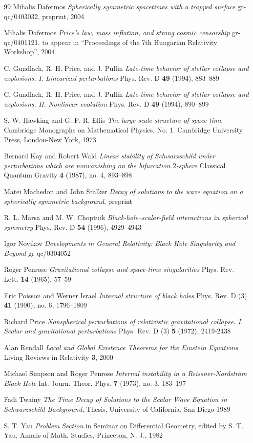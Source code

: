 \begin{thebibliography}{99}
 Mihalis Dafermos \emph{Spherically
symmetric spacetimes with a trapped surface} gr-qc/0403032, preprint,
2004

 Mihalis Dafermos \emph{Price's law,
mass inflation, and strong cosmic censorship} gr-qc/0401121,
to appear in ``Proceedings of the 7th Hungarian Relativity Workshop'',
2004


 C. Gundlach, R. H. Price, and J. Pullin
\emph{Late-time behavior of stellar collapse and explosions. I.
Linearized perturbations} Phys. Rev. D {\bf 49} (1994), 883--889

 C. Gundlach, R. H. Price, and J. Pullin
\emph{Late-time behavior of stellar collapse and explosions. II.
Nonlinear evolution} Phys. Rev. D {\bf 49} (1994), 890--899
 
 S. W. Hawking and G. F. R. Ellis
\emph{The large scale structure of space-time} Cambridge
Monographs on Mathematical Physics, No. 1. Cambridge
University Press, London-New York, 1973

 Bernard Kay and Robert Wald
\emph{Linear stability of Schwarzschild under perturbations
which are nonvanishing on the bifurcation $2$-sphere}
Classical Quantum Gravity {\bf 4} (1987), no. 4, 893--898

 Matei Machedon and
John Stalker \emph{Decay of solutions to the wave
equation on a spherically symmetric background}, preprint

 R. L. Marsa and M. W. Choptuik
\emph{Black-hole--scalar-field interactions in spherical symmetry}
Phys. Rev. D {\bf 54} (1996), 4929--4943

 Igor Novikov \emph{Developments in General Relativity:
Black Hole Singularity and Beyond} gr-qc/0304052

 Roger Penrose \emph{Gravitational collapse
and space-time singularities} Phys. Rev. Lett. {\bf 14} (1965), 57--59

 Eric Poisson and Werner Israel
\emph{Internal structure of black holes}
Phys. Rev. D (3) {\bf 41} (1990), no. 6, 1796--1809

 Richard Price \emph{Nonspherical perturbations
of relativistic gravitational collapse. I. Scalar and gravitational
perturbations} Phys. Rev. D (3) {\bf 5} (1972), 2419-2438

 Alan Rendall
\emph{Local and Global Existence Theorems for the Einstein Equations}
Living Reviews in Relativity {\bf 3}, 2000

 Michael Simpson and Roger Penrose \emph{Internal
instability in a Reissner-Nordstr\"om Black Hole} Int. Journ.
Theor. Phys. {\bf 7} (1973), no. 3, 183--197

 Fadi Twainy \emph{The Time Decay of Solutions
to the Scalar Wave Equation in Schwarzschild Background},
Thesis, University of California, San Diego 1989

 S. T. Yau \emph{Problem Section} in Seminar on
Differential Geometry, edited by S. T. Yau, Annals of
Math. Studies, Princeton, N. J., 1982
\end{thebibliography}
